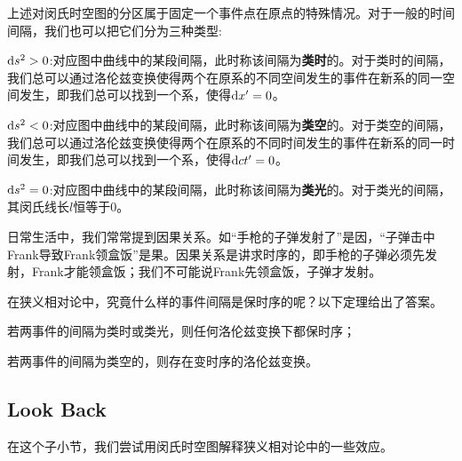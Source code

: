 上述对闵氏时空图的分区属于固定一个事件点在原点的特殊情况。对于一般的时间间隔，我们也可以把它们分为三种类型:
\begin{Itemize}
    \item $\dif s^2>0$:对应图中曲线\uppercase\expandafter{}中的某段间隔，此时称该间隔为\textbf{类时}的。对于类时的间隔，我们总可以通过洛伦兹变换使得两个在原系的不同空间发生的事件在新系的同一空间发生，即我们总可以找到一个系，使得$\dif x'=0$。
    \item $\dif s^2<0$:对应图中曲线\uppercase\expandafter{}中的某段间隔，此时称该间隔为\textbf{类空}的。对于类空的间隔，我们总可以通过洛伦兹变换使得两个在原系的不同时间发生的事件在新系的同一时间发生，即我们总可以找到一个系，使得$\dif ct'=0$。
    \item $\dif s^2=0$:对应图中曲线\uppercase\expandafter{}中的某段间隔，此时称该间隔为\textbf{类光}的。对于类光的间隔，其闵氏线长$l$恒等于$0$。
\end{Itemize}

日常生活中，我们常常提到因果关系。如``手枪的子弹发射了''是因，``子弹击中Frank导致Frank领盒饭''是果。因果关系是讲求时序的，即手枪的子弹必须先发射，Frank才能领盒饭；我们不可能说Frank先领盒饭，子弹才发射。

在狭义相对论中，究竟什么样的事件间隔是保时序的呢？以下定理给出了答案。
\begin{law}
    \begin{Itemize}
        \item 若两事件的间隔为类时或类光，则任何洛伦兹变换下都保时序；
        \item 若两事件的间隔为类空的，则存在变时序的洛伦兹变换。
    \end{Itemize}
\end{law}
\subsection[回顾]{Look Back}
在这个子小节，我们尝试用闵氏时空图解释狭义相对论中的一些效应。


